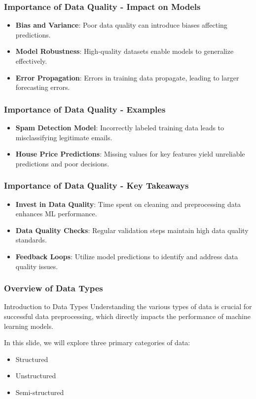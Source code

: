 \documentclass[aspectratio=169]{beamer}
\begin{document}
\begin{frame}[fragile]
    \frametitle{Importance of Data Quality - Impact on Models}
    \begin{itemize}
        \item \textbf{Bias and Variance}: Poor data quality can introduce biases affecting predictions.
        \item \textbf{Model Robustness}: High-quality datasets enable models to generalize effectively.
        \item \textbf{Error Propagation}: Errors in training data propagate, leading to larger forecasting errors.
    \end{itemize}
\end{frame}

\begin{frame}[fragile]
    \frametitle{Importance of Data Quality - Examples}
    \begin{itemize}
        \item \textbf{Spam Detection Model}: Incorrectly labeled training data leads to misclassifying legitimate emails.
        \item \textbf{House Price Predictions}: Missing values for key features yield unreliable predictions and poor decisions.
    \end{itemize}
\end{frame}

\begin{frame}[fragile]
    \frametitle{Importance of Data Quality - Key Takeaways}
    \begin{itemize}
        \item \textbf{Invest in Data Quality}: Time spent on cleaning and preprocessing data enhances ML performance.
        \item \textbf{Data Quality Checks}: Regular validation steps maintain high data quality standards.
        \item \textbf{Feedback Loops}: Utilize model predictions to identify and address data quality issues.
    \end{itemize}
\end{frame}

\begin{frame}[fragile]
    \frametitle{Overview of Data Types}
    \begin{block}{Introduction to Data Types}
        Understanding the various types of data is crucial for successful data preprocessing, which directly impacts the performance of machine learning models. 
    \end{block}
    In this slide, we will explore three primary categories of data:
    \begin{itemize}
        \item Structured
        \item Unstructured
        \item Semi-structured
    \end{itemize}
\end{frame}
\end{document}
